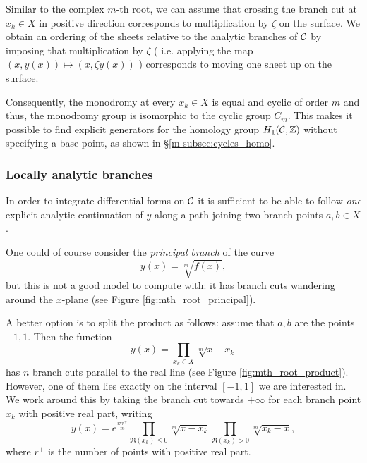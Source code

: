 \documentclass[main.tex]{subfiles}
\begin{document}
  \bigskip
  
  Similar to the complex $m$-th root, we can assume that crossing the branch cut at $x_k \in X$ in positive direction corresponds to multiplication by $\zeta$ on the surface. We
  obtain an ordering of the sheets relative to the analytic branches of $\mathcal{C}$ by imposing that multiplication by $\zeta$ ( i.e. applying the map
  $(x,y(x)) \mapsto (x,\zeta y(x))$ ) corresponds to moving one sheet up on the surface.
  
   \bigskip
  
  Consequently, the monodromy at every $x_k \in X$
  is equal and cyclic of order $m$ and thus, the monodromy group is isomorphic to the cyclic group $C_m$. This makes it possible to find explicit generators for the
  homology group $H_1(\mathcal{C},\mathbb{Z})$ without specifying a base point, as shown in \S \ref{m-subsec:cycles_homo}.

  \subsubsection{Locally analytic branches}

  In order to integrate differential forms on $\mathcal{C}$
  it is sufficient to be able to follow \emph{one} explicit analytic continuation of $y$ along a
  path joining two branch points $a, b \in X$.

  One could of course consider the \emph{principal branch} of the curve
  \begin{equation*}
      y(x) = \sqrt[m]{f(x)},
  \end{equation*}
  but this is not a good model to compute with: it has branch cuts
  wandering around the $x$-plane (see Figure \ref{fig:mth_root_principal}).
  
  A better option is to split the product as follows:
  assume that $a,b$ are the points $-1,1$. Then the function
  \begin{equation*}
      y(x) = \prod_{x_k\in X}\sqrt[m]{x-x_k}
  \end{equation*}
  has $n$ branch cuts parallel to the real line (see Figure \ref{fig:mth_root_product}).
  However, one of them lies exactly on the interval $[-1,1]$ we are interested in. We work around this
  by taking the branch cut towards $+\infty$ for each branch point $x_k$ with positive real part, writing
  \begin{equation*}
      y(x) = e^{\frac{iπr^+}m}\prod_{\Re(x_k)\leq0}\sqrt[m]{x-x_k} \prod_{\Re(x_k)>0}\sqrt[m]{x_k-x},
  \end{equation*}
  where $r^+$ is the number of points with positive real part.
  
\end{document}

